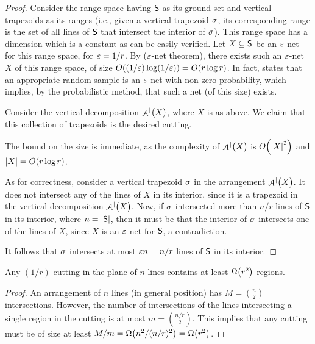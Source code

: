 \begin{proof}
    Consider the range space having $\mathsf{S}$ as its ground set and
    vertical trapezoids as its ranges (i.e., given a vertical
    trapezoid $\sigma$, its corresponding range is the set of all lines
    of $\mathsf{S}$ that intersect the interior of $\sigma$). This range
    space has a \VC dimension which is a constant as can be easily
    verified. Let $X \subseteq \mathsf{S}$ be an ${\varepsilon}$-net for this
    range space, for ${\varepsilon} = 1/r$. By  (${\varepsilon}$-net
    theorem), there exists such an ${\varepsilon}$-net $X$ of this range space,
    of size $O((1/{\varepsilon}) \log (1/{\varepsilon})) = O(r \log r)$. In fact,
     states that an appropriate random sample is
    an ${\varepsilon}$-net with non-zero probability, which implies, by the
    probabilistic method, that such a net (of this size) exists.

    Consider the vertical decomposition $\ArrVD{\bigl.X}$, where $X$
    is as above. We claim that this collection of trapezoids is the
    desired cutting.
    
    The bound on the size is immediate, as the complexity of
    $\ArrVD{\bigl.X}$ is $O\pth{\cardin{X}^2}$ and $\left| {X} \right| = O( r
    \log r)$.
    
    As for correctness, consider a vertical trapezoid $\sigma$ in the
    arrangement $\ArrVD{\bigl.X}$. It does not intersect any of the
    lines of $X$ in its interior, since it is a trapezoid in the
    vertical decomposition $\ArrVD{\bigl.X}$. Now, if $\sigma$
    intersected more than $n/r$ lines of $\mathsf{S}$ in its interior,
    where $n = \left| {\mathsf{S}} \right|$, then it must be that the interior of
    $\sigma$ intersects one of the lines of $X$, since $X$ is an
    ${\varepsilon}$-net for $\mathsf{S}$, a contradiction.
    
    It follows that $\sigma$ intersects at most ${\varepsilon} n = n/r$ lines of
    $\mathsf{S}$ in its interior.
\end{proof}


\begin{claim}
    Any $(1/r)$-cutting in the plane of $n$ lines contains at least
    $\Omega\pth{r^2}$ regions.
\end{claim}
\begin{proof}
    An arrangement of $n$ lines (in general position) has $M =
    \binom{n}{2}$ intersections. However, the number of intersections
    of the lines intersecting a single region in the cutting is at
    most $m = \binom{n/r}{2}$. This implies that any cutting must be
    of size at least $M / m = \Omega\pth{ n^2 / (n/r)^2 } =
    \Omega\pth{r^2}$.
\end{proof}



